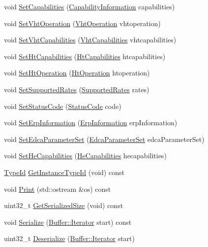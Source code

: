 \begin{DoxyCompactItemize}
void \hyperlink{classns3_1_1MgtAssocResponseHeader_a40ca16cc0c664523438d5401b11ca0b7}{Set\+Capabilities} (\hyperlink{classns3_1_1CapabilityInformation}{Capability\+Information} capabilities)
\item 
void \hyperlink{classns3_1_1MgtAssocResponseHeader_a9c2d4e54b6dd1a3bb7ed5e71aecafbdd}{Set\+Vht\+Operation} (\hyperlink{classns3_1_1VhtOperation}{Vht\+Operation} vhtoperation)
\item 
void \hyperlink{classns3_1_1MgtAssocResponseHeader_a344f9813d123a964fdb70e6622e048e5}{Set\+Vht\+Capabilities} (\hyperlink{classns3_1_1VhtCapabilities}{Vht\+Capabilities} vhtcapabilities)
\item 
void \hyperlink{classns3_1_1MgtAssocResponseHeader_a97bbf320744e6614183869d0450f62b3}{Set\+Ht\+Capabilities} (\hyperlink{classns3_1_1HtCapabilities}{Ht\+Capabilities} htcapabilities)
\item 
void \hyperlink{classns3_1_1MgtAssocResponseHeader_aef5c8f223385100100ccf8d84bf4ef4f}{Set\+Ht\+Operation} (\hyperlink{classns3_1_1HtOperation}{Ht\+Operation} htoperation)
\item 
void \hyperlink{classns3_1_1MgtAssocResponseHeader_af2419290c8c3db2702e5f79fa6a7ea19}{Set\+Supported\+Rates} (\hyperlink{classns3_1_1SupportedRates}{Supported\+Rates} rates)
\item 
void \hyperlink{classns3_1_1MgtAssocResponseHeader_a441cbaabb607faba099e63507ebf97e0}{Set\+Status\+Code} (\hyperlink{classns3_1_1StatusCode}{Status\+Code} code)
\item 
void \hyperlink{classns3_1_1MgtAssocResponseHeader_a04a15a6de191586d205ec6e401b711cb}{Set\+Erp\+Information} (\hyperlink{classns3_1_1ErpInformation}{Erp\+Information} erp\+Information)
\item 
void \hyperlink{classns3_1_1MgtAssocResponseHeader_abd943bea3efcbec949df65501ce6761c}{Set\+Edca\+Parameter\+Set} (\hyperlink{classns3_1_1EdcaParameterSet}{Edca\+Parameter\+Set} edca\+Parameter\+Set)
\item 
void \hyperlink{classns3_1_1MgtAssocResponseHeader_ad27237554f8b47597a8fc54caf16277c}{Set\+He\+Capabilities} (\hyperlink{classns3_1_1HeCapabilities}{He\+Capabilities} hecapabilities)
\item 
\hyperlink{classns3_1_1TypeId}{Type\+Id} \hyperlink{classns3_1_1MgtAssocResponseHeader_a992feba0313d73170736ce7f04382467}{Get\+Instance\+Type\+Id} (void) const 
\item 
void \hyperlink{classns3_1_1MgtAssocResponseHeader_a6028f8331e5b7881abe7daca5a2ce3ea}{Print} (std\+::ostream \&os) const 
\item 
uint32\+\_\+t \hyperlink{classns3_1_1MgtAssocResponseHeader_a62fadba67903257b7fde67e8a0fab7d2}{Get\+Serialized\+Size} (void) const 
\item 
void \hyperlink{classns3_1_1MgtAssocResponseHeader_a2b3e70a1b228b9f3ca8b8a43068f13a2}{Serialize} (\hyperlink{classns3_1_1Buffer_1_1Iterator}{Buffer\+::\+Iterator} start) const 
\item 
uint32\+\_\+t \hyperlink{classns3_1_1MgtAssocResponseHeader_a02b3614f4b8248577849c4091220666d}{Deserialize} (\hyperlink{classns3_1_1Buffer_1_1Iterator}{Buffer\+::\+Iterator} start)
\end{DoxyCompactItemize}
